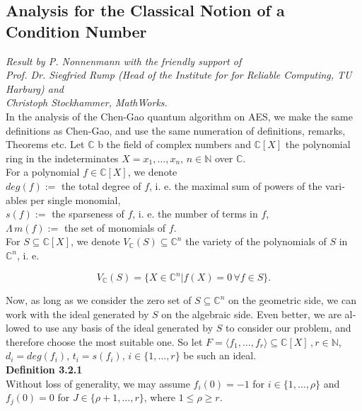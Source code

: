 \documentclass[a4paper,11pt]{article}
\begin{document}
\begin{otherlanguage}{english}
\subsection{Analysis for the Classical Notion of a Condition Number}
\noindent 
{\small \textit{Result by P. Nonnenmann with the friendly support of \\
Prof. Dr. Siegfried Rump (Head of the Institute for for Reliable Computing, TU Harburg) and\\
Christoph Stockhammer, MathWorks.}}\\

\noindent
In the analysis of the Chen-Gao quantum algorithm on \textsc{AES}, we make the same definitions as Chen-Gao, and use the same numeration of definitions, remarks, Theorems  etc. Let $\mathbb{C}$ b the field of complex numbers and $\mathbb{C}[X]$ the polynomial ring in the indeterminates $X = x_1, \ldots, x_n, \, n \in \mathbb{N}$ over $\mathbb{C}$. \\

\noindent
For a polynomial $f \in \mathbb{C}[X]$, we denote \\

\noindent
$deg(f) :=$ the total degree of $f$, i. e. the maximal sum of powers of the variables per single monomial,\\
\noindent
$s(f) :=$ the sparseness of $f$, i. e. the number of terms in $f$, \\
\noindent
$\Lambda \, m(f) :=$ the set of monomials of $f$. \\

\noindent
For $S \subseteq \mathbb{C}[X]$, we denote $V_{\mathbb{C}}(S) \subseteq \mathbb{C}^n$ the variety of the polynomials of $S$ in $\mathbb{C}^n$, i. e. 

$$V_{\mathbb{C}}(S) = \{ X \in \mathbb{C}^n | f(X) = 0 \, \forall f \in S\}.$$
\vspace{0.1cm}

\noindent
Now, as long as we consider the zero set of $S \subseteq \mathbb{C}^n$ on the geometric side, we can work with the ideal generated by $S$ on the algebraic side. Even better, we are allowed to use any basis of the ideal generated by $S$ to consider our problem, and therefore choose the most suitable one. So let $F = \langle f_1, \ldots, f_r \rangle \subseteq \mathbb{C}[X]\, , r \in \mathbb{N}$, $d_i = deg(f_i)$, $t_i = s(f_i), \, i \in \{1, \ldots, r\}$ be such an ideal.\\

\noindent
\textbf{Definition 3.2.1}\\
Without loss of generality, we may assume $f_i(0) = -1$ for $i \in \{1, \ldots, \rho \}$ and $f_j(0) = 0$ for $J \in \{\rho + 1, \ldots, r \}$, where $1 \leq \rho \geq r$. \\


\end{otherlanguage}
\end{document}
